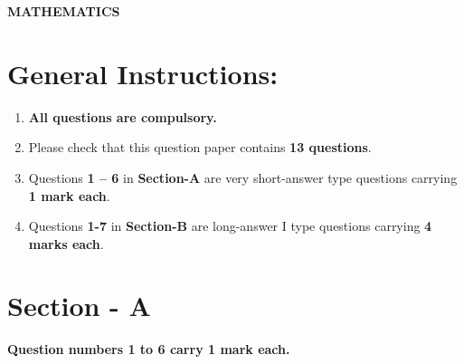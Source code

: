\documentclass[a4paper 12pt]{article}
\date{\tdoady}
\begin{document}
 
\thispagestyle{fancy}
\fancyhf{} %
\renewcommand{\headrulewidth}{0pt} %
\fancyfoot[C]{\thepage} %
\vspace*{1cm}
\begin{center}

    \textbf{\Huge MATHEMATICS}

\end{center}



\section*{General Instructions:}

\begin{enumerate}
    \item \textbf{All questions are compulsory.}
    \item Please check that this question paper contains \textbf{13 questions}.
    \item Questions \textbf{1 – 6} in \textbf{Section-A} are very short-answer type questions carrying \textbf{1 mark each}.
    \item Questions \textbf{1-7} in \textbf{Section-B} are long-answer I type questions carrying \textbf{4 marks each}.
    
\end{enumerate}

\vspace{1cm}

\section*{Section - A}

\textbf{Question numbers 1 to 6 carry 1 mark each.}
\end{document}
